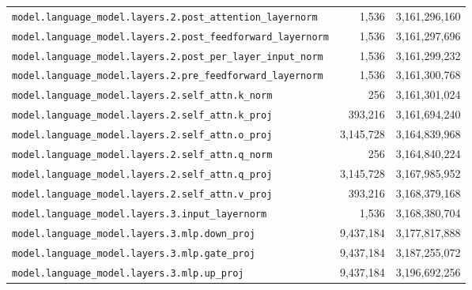 \documentclass[10pt,a4paper]{article}
\theoremstyle{definition}
\begin{document}
\begin{appendices}
\begin{longtable}{p{9.5cm}rr}
\texttt{model.\allowbreak{}language\_model.\allowbreak{}layers.\allowbreak{}2.\allowbreak{}post\_attention\_layernorm} & 1,536 & 3,161,296,160 \\
\texttt{model.\allowbreak{}language\_model.\allowbreak{}layers.\allowbreak{}2.\allowbreak{}post\_feedforward\_layernorm} & 1,536 & 3,161,297,696 \\
\texttt{model.\allowbreak{}language\_model.\allowbreak{}layers.\allowbreak{}2.\allowbreak{}post\_per\_layer\_input\_norm} & 1,536 & 3,161,299,232 \\
\texttt{model.\allowbreak{}language\_model.\allowbreak{}layers.\allowbreak{}2.\allowbreak{}pre\_feedforward\_layernorm} & 1,536 & 3,161,300,768 \\
\texttt{model.\allowbreak{}language\_model.\allowbreak{}layers.\allowbreak{}2.\allowbreak{}self\_attn.\allowbreak{}k\_norm} & 256 & 3,161,301,024 \\
\texttt{model.\allowbreak{}language\_model.\allowbreak{}layers.\allowbreak{}2.\allowbreak{}self\_attn.\allowbreak{}k\_proj} & 393,216 & 3,161,694,240 \\
\texttt{model.\allowbreak{}language\_model.\allowbreak{}layers.\allowbreak{}2.\allowbreak{}self\_attn.\allowbreak{}o\_proj} & 3,145,728 & 3,164,839,968 \\
\texttt{model.\allowbreak{}language\_model.\allowbreak{}layers.\allowbreak{}2.\allowbreak{}self\_attn.\allowbreak{}q\_norm} & 256 & 3,164,840,224 \\
\texttt{model.\allowbreak{}language\_model.\allowbreak{}layers.\allowbreak{}2.\allowbreak{}self\_attn.\allowbreak{}q\_proj} & 3,145,728 & 3,167,985,952 \\
\texttt{model.\allowbreak{}language\_model.\allowbreak{}layers.\allowbreak{}2.\allowbreak{}self\_attn.\allowbreak{}v\_proj} & 393,216 & 3,168,379,168 \\
\texttt{model.\allowbreak{}language\_model.\allowbreak{}layers.\allowbreak{}3.\allowbreak{}input\_layernorm} & 1,536 & 3,168,380,704 \\
\texttt{model.\allowbreak{}language\_model.\allowbreak{}layers.\allowbreak{}3.\allowbreak{}mlp.\allowbreak{}down\_proj} & 9,437,184 & 3,177,817,888 \\
\texttt{model.\allowbreak{}language\_model.\allowbreak{}layers.\allowbreak{}3.\allowbreak{}mlp.\allowbreak{}gate\_proj} & 9,437,184 & 3,187,255,072 \\
\texttt{model.\allowbreak{}language\_model.\allowbreak{}layers.\allowbreak{}3.\allowbreak{}mlp.\allowbreak{}up\_proj} & 9,437,184 & 3,196,692,256 \\

\end{longtable}
\end{appendices}
\end{document}
